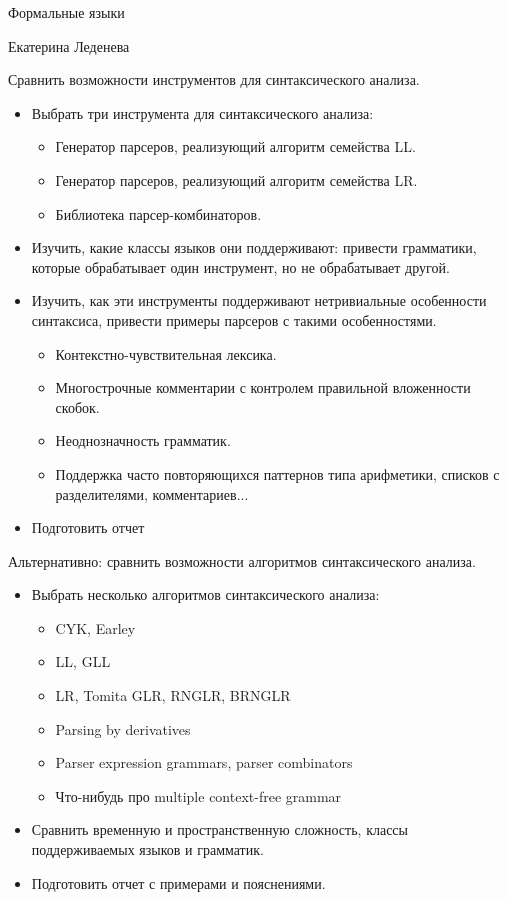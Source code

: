 \documentclass[12pt]{article}
\begin{document}
\begin{center}
{\LARGE Формальные языки}

\bigskip

{\Large Екатерина Леденева}
\end{center}

\bigskip

Сравнить возможности инструментов для синтаксического анализа.

\begin{itemize}
  \item Выбрать три инструмента для синтаксического анализа:
  \begin{itemize}
    \item Генератор парсеров, реализующий алгоритм семейства LL.
    \item Генератор парсеров, реализующий алгоритм семейства LR.
    \item Библиотека парсер-комбинаторов.
  \end{itemize}
  \item Изучить, какие классы языков они поддерживают: привести грамматики, которые обрабатывает один инструмент, но не обрабатывает другой.
  \item Изучить, как эти инструменты поддерживают нетривиальные особенности синтаксиса, привести примеры парсеров с такими особенностями.
  \begin{itemize}
    \item Контекстно-чувствительная лексика.
    \item Многострочные комментарии с контролем правильной вложенности скобок.
    \item Неоднозначность грамматик.
    \item Поддержка часто повторяющихся паттернов типа арифметики, списков с разделителями, комментариев...
  \end{itemize}
  \item Подготовить отчет
\end{itemize}

Альтернативно: сравнить возможности алгоритмов синтаксического анализа.

\begin{itemize}
  \item Выбрать несколько алгоритмов синтаксического анализа:
  \begin{itemize}
    \item CYK, Earley
    \item LL, GLL
    \item LR, Tomita GLR, RNGLR, BRNGLR
    \item Parsing by derivatives
    \item Parser expression grammars, parser combinators
    \item Что-нибудь про multiple context-free grammar
  \end{itemize}
  \item Сравнить временную и пространственную сложность, классы поддерживаемых языков и грамматик.
  \item Подготовить отчет с примерами и пояснениями.
\end{itemize}
\end{document}

